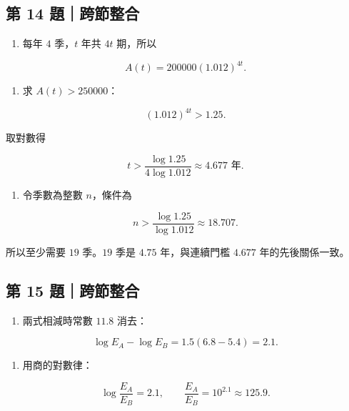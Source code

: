 \documentclass[11pt,a4paper]{article}
\providecommand{\tightlist}{%
  \setlength{\itemsep}{0pt}\setlength{\parskip}{0pt}}
\begin{document}
\subsection{第 14 題｜跨節整合}\label{ux7b2c-14-ux984cux8de8ux7bc0ux6574ux5408}

\begin{enumerate}
\def\labelenumi{(\alph{enumi})}
\tightlist
\item
  每年 \(4\) 季，\(t\) 年共 \(4t\) 期，所以
\end{enumerate}

\[
A(t)=200000(1.012)^{4t}.
\]

\begin{enumerate}
\def\labelenumi{(\alph{enumi})}
\setcounter{enumi}{1}
\tightlist
\item
  求 \(A(t)>250000\)：
\end{enumerate}

\[
(1.012)^{4t}>1.25.
\]

取對數得

\[
t>\frac{\log1.25}{4\log1.012}\approx4.677\text{ 年}.
\]

\begin{enumerate}
\def\labelenumi{(\alph{enumi})}
\setcounter{enumi}{2}
\tightlist
\item
  令季數為整數 \(n\)，條件為
\end{enumerate}

\[
n>\frac{\log1.25}{\log1.012}\approx18.707.
\]

所以至少需要 \(19\) 季。\(19\) 季是 \(4.75\) 年，與連續門檻 \(4.677\) 年的先後關係一致。

\subsection{第 15 題｜跨節整合}\label{ux7b2c-15-ux984cux8de8ux7bc0ux6574ux5408}

\begin{enumerate}
\def\labelenumi{(\alph{enumi})}
\tightlist
\item
  兩式相減時常數 \(11.8\) 消去：
\end{enumerate}

\[
\log E_A-\log E_B
=1.5(6.8-5.4)=2.1.
\]

\begin{enumerate}
\def\labelenumi{(\alph{enumi})}
\setcounter{enumi}{1}
\tightlist
\item
  用商的對數律：
\end{enumerate}

\[
\log\frac{E_A}{E_B}=2.1,\qquad
\frac{E_A}{E_B}=10^{2.1}\approx125.9.
\]
\end{document}
